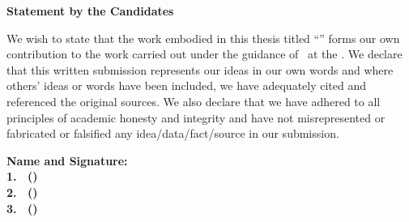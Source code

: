\thispagestyle{empty}
\vspace*{0.2cm}
\begin{center}
{\Large\bfseries Statement by the Candidates}
\end{center}

\vspace{2cm}

\noindent We wish to state that the work embodied in this thesis titled ``\projecttitle'' forms our own contribution to the work carried out under the guidance of \guidename\ at the \institute. We declare that this written submission represents our ideas in our own words and where others' ideas or words have been included, we have adequately cited and referenced the original sources. We also declare that we have adhered to all principles of academic honesty and integrity and have not misrepresented or fabricated or falsified any idea/data/fact/source in our submission.

\vspace{5cm}

\noindent\textbf{Name and Signature:}\\[0.3cm]
\textbf{1. \candone\ (\uidone)}\\[0.8cm]
\textbf{2. \candtwo\ (\uidtwo)}\\[0.8cm]
\textbf{3. \candthree\ (\uidthree)}
